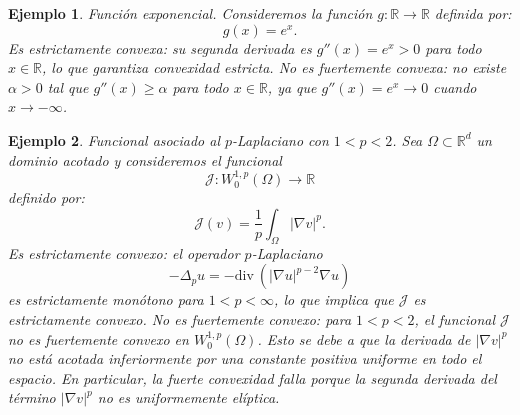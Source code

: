 \documentclass[12pt]{book}
\newtheorem{ex}{Ejemplo}
\theoremstyle{definition}
\theoremstyle{plain}
\theoremstyle{remark}
\begin{document}
\begin{ex}
Función exponencial.
   Consideremos la función \(g: \mathbb{R} \to \mathbb{R}\) definida por:
   \[
   g(x) = e^x.
   \]
Es estrictamente convexa: su segunda derivada es \(g''(x) = e^x > 0\) para todo \(x \in \mathbb{R}\), lo que garantiza convexidad estricta.
No es fuertemente convexa: no existe \(\alpha > 0\) tal que \(g''(x) \geq \alpha\) para todo \(x \in \mathbb{R}\), ya que \(g''(x) = e^x \to 0\) cuando \(x \to -\infty\).
\end{ex}


\begin{ex}
Funcional asociado al \(p\)-Laplaciano con \(1 < p < 2\).
   Sea \(\Omega \subset \mathbb{R}^d\) un dominio acotado y consideremos el funcional \[\mathcal{J}: W_0^{1,p}(\Omega) \to \mathbb{R}\] definido por:
   \[
   \mathcal{J}(v) = \frac{1}{p} \int_\Omega |\nabla v|^p. %
   \]
Es estrictamente convexo: el operador \(p\)-Laplaciano \[-\Delta_p u = -\mathrm{div}\ (|\nabla u|^{p-2} \nabla u)\] es estrictamente monótono para \(1 < p < \infty\), lo que implica que \(\mathcal{J}\) es estrictamente convexo.
No es fuertemente convexo: para \(1 < p < 2\), el funcional \(\mathcal{J}\) no es fuertemente convexo en \(W_0^{1,p}(\Omega)\). Esto se debe a que la derivada de \(|\nabla v|^p\) no está acotada inferiormente por una constante positiva uniforme en todo el espacio. En particular, la fuerte convexidad falla porque la segunda derivada del término \(|\nabla v|^p\) no es uniformemente elíptica.
\end{ex}
\end{document}
